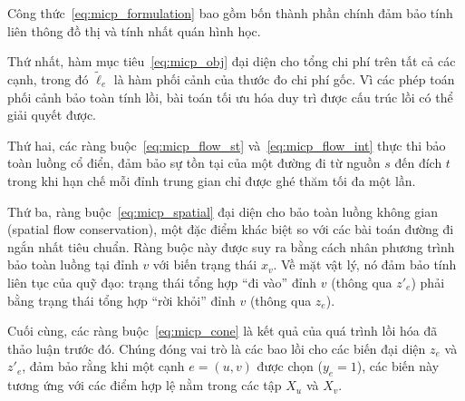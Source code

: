 Công thức~\eqref{eq:micp_formulation} bao gồm bốn thành phần chính đảm bảo tính liên thông đồ thị và tính nhất quán hình học.

Thứ nhất, hàm mục tiêu~\eqref{eq:micp_obj} đại diện cho tổng chi phí trên tất cả các cạnh, trong đó $\tilde{\ell}_e$ là hàm phối cảnh của thước đo chi phí gốc. Vì các phép toán phối cảnh bảo toàn tính lồi, bài toán tối ưu hóa duy trì được cấu trúc lồi có thể giải quyết được.

Thứ hai, các ràng buộc~\eqref{eq:micp_flow_st} và~\eqref{eq:micp_flow_int} thực thi bảo toàn luồng cổ điển, đảm bảo sự tồn tại của một đường đi từ nguồn $s$ đến đích $t$ trong khi hạn chế mỗi đỉnh trung gian chỉ được ghé thăm tối đa một lần.

Thứ ba, ràng buộc~\eqref{eq:micp_spatial} đại diện cho bảo toàn luồng không gian (spatial flow conservation), một đặc điểm khác biệt so với các bài toán đường đi ngắn nhất tiêu chuẩn. Ràng buộc này được suy ra bằng cách nhân phương trình bảo toàn luồng tại đỉnh $v$ với biến trạng thái $x_v$. Về mặt vật lý, nó đảm bảo tính liên tục của quỹ đạo: trạng thái tổng hợp ``đi vào'' đỉnh $v$ (thông qua $z'_e$) phải bằng trạng thái tổng hợp ``rời khỏi'' đỉnh $v$ (thông qua $z_e$).

Cuối cùng, các ràng buộc~\eqref{eq:micp_cone} là kết quả của quá trình lồi hóa đã thảo luận trước đó. Chúng đóng vai trò là các bao lồi cho các biến đại diện $z_e$ và $z'_e$, đảm bảo rằng khi một cạnh $e=(u,v)$ được chọn ($y_e=1$), các biến này tương ứng với các điểm hợp lệ nằm trong các tập $X_u$ và $X_v$.

